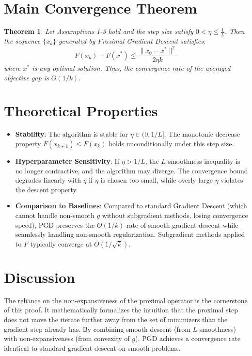 \documentclass{article}
\newtheorem{theorem}{Theorem}
\begin{document}
\section*{Main Convergence Theorem}
\begin{theorem}
Let Assumptions 1-3 hold and the step size satisfy $0 < \eta \leq \frac{1}{L}$. Then the sequence $\{x_k\}$ generated by Proximal Gradient Descent satisfies:
\begin{equation}
    F(x_k) - F(x^*) \leq \frac{\|x_0 - x^*\|^2}{2 \eta k}
\end{equation}
where $x^*$ is any optimal solution. Thus, the convergence rate of the averaged objective gap is $O(1/k)$.
\end{theorem}

\section*{Theoretical Properties}
\begin{itemize}
    \item \textbf{Stability}: The algorithm is stable for $\eta \in (0, 1/L]$. The monotonic decrease property $F(x_{k+1}) \leq F(x_k)$ holds unconditionally under this step size.
    \item \textbf{Hyperparameter Sensitivity}: If $\eta > 1/L$, the $L$-smoothness inequality is no longer contractive, and the algorithm may diverge. The convergence bound degrades linearly with $\eta$ if $\eta$ is chosen too small, while overly large $\eta$ violates the descent property.
    \item \textbf{Comparison to Baselines}: Compared to standard Gradient Descent (which cannot handle non-smooth $g$ without subgradient methods, losing convergence speed), PGD preserves the $O(1/k)$ rate of smooth gradient descent while seamlessly handling non-smooth regularization. Subgradient methods applied to $F$ typically converge at $O(1/\sqrt{k})$.
\end{itemize}

\section*{Discussion}
The reliance on the non-expansiveness of the proximal operator is the cornerstone of this proof. It mathematically formalizes the intuition that the proximal step does not move the iterate further away from the set of minimizers than the gradient step already has. By combining smooth descent (from $L$-smoothness) with non-expansiveness (from convexity of $g$), PGD achieves a convergence rate identical to standard gradient descent on smooth problems.
\end{document}

